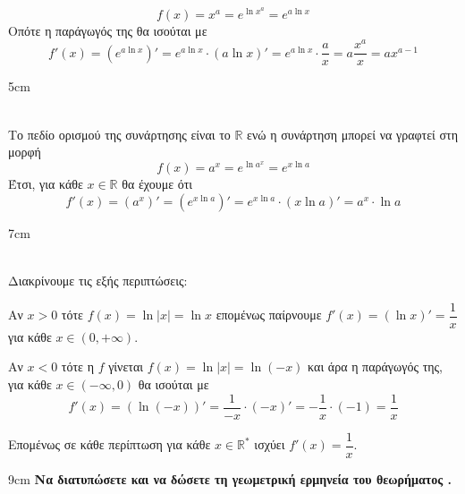\[ f(x)=x^a=e^{\ln{x^a}}=e^{a\ln{x}} \]
Οπότε η παράγωγός της θα ισούται με
\[ f'(x)=\left( e^{a\ln{x}}\right)'=e^{a\ln{x}}\cdot(a\ln{x})'=e^{a\ln{x}}\cdot\dfrac{a}{x}=a\dfrac{x^{a}}{x}=ax^{a-1} \]
\begin{Thewrhmabox}{5cm}
\label{thewrhma:paragwgos_ekthetikhs}
\end{Thewrhmabox}
\textbf{}\\
Το πεδίο ορισμού της συνάρτησης είναι το $ \mathbb{R} $ ενώ η συνάρτηση μπορεί να γραφτεί στη μορφή
\[ f(x)=a^x=e^{\ln{a^x}}=e^{x\ln{a}} \]
Έτσι, για κάθε $ x\in\mathbb{R} $ θα έχουμε ότι
\[ f'(x)=\left(a^x\right)'=\left( e^{x\ln{a}}\right)'=e^{x\ln{a}}\cdot(x\ln{a})'=a^x\cdot\ln{a} \]
\begin{Thewrhmabox}{7cm}
\label{thewrhma:paragwgos_logarithmou}
\end{Thewrhmabox}
\textbf{}\\
Διακρίνουμε τις εξής περιπτώσεις:
\begin{alist}
\item Αν $ x>0 $ τότε $ f(x)=\ln{|x|}=\ln{x} $ επομένως παίρνουμε $ f'(x)=(\ln{x})'=\dfrac{1}{x} $ για κάθε $ x\in(0,+\infty) $.
\item Αν $ x<0 $ τότε η $ f $ γίνεται $ f(x)=\ln{|x|}=\ln{(-x)} $ και άρα η παράγωγός της, για κάθε $ x\in(-\infty,0) $ θα ισούται με 
\[ f'(x)=(\ln{(-x)})'=\dfrac{1}{-x}\cdot(-x)'=-\dfrac{1}{x}\cdot(-1)=\dfrac{1}{x} \]
\end{alist}
Επομένως σε κάθε περίπτωση για κάθε $ x\in\mathbb{R}^* $ ισχύει $ f'(x)=\dfrac{1}{x} $.
\begin{Thewrhmabox}{9cm}
\label{thewrhma:rolle}
\textbf{Να διατυπώσετε και να δώσετε τη γεωμετρική ερμηνεία του θεωρήματος .}
\end{Thewrhmabox}
{}
